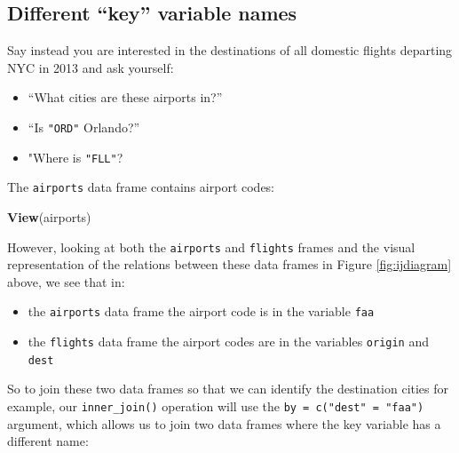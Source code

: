 \documentclass[12pt, krantz2,]{krantz}
\makeatletter
\newenvironment{Shaded}{\begin{snugshade}}{\end{snugshade}}
\newcommand{\DataTypeTok}[1]{\textcolor[rgb]{0.27,0.27,0.27}{#1}}
\newcommand{\KeywordTok}[1]{\textcolor[rgb]{0.27,0.27,0.27}{\textbf{#1}}}
\newcommand{\NormalTok}[1]{#1}
\newcommand{\OperatorTok}[1]{\textcolor[rgb]{0.43,0.43,0.43}{\textbf{#1}}}
\newcommand{\StringTok}[1]{\textcolor[rgb]{0.5,0.5,0.5}{#1}}
\providecommand{\tightlist}{%
  \setlength{\itemsep}{0pt}\setlength{\parskip}{0pt}}
\newenvironment{kframe}{%
\medskip{}
\setlength{\fboxsep}{.8em}
 \def\at@end@of@kframe{}%
 \ifinner\ifhmode%
  \def\at@end@of@kframe{\end{minipage}}%
  \begin{minipage}{\columnwidth}%
 \fi\fi%
 \def\FrameCommand##1{\hskip\@totalleftmargin \hskip-\fboxsep
 \colorbox{shadecolor}{##1}\hskip-\fboxsep
     \hskip-\linewidth \hskip-\@totalleftmargin \hskip\columnwidth}%
 \MakeFramed {\advance\hsize-\width
   \@totalleftmargin\z@ \linewidth\hsize
   \@setminipage}}%
 {\par\unskip\endMakeFramed%
 \at@end@of@kframe}
\renewenvironment{Shaded}{\begin{kframe}}{\end{kframe}}
\makeatother
\begin{document}
\hypertarget{diff-key}{%
\subsection{Different ``key'' variable names}\label{diff-key}}

Say instead you are interested in the destinations of all domestic flights departing NYC in 2013 and ask yourself:

\begin{itemize}
\tightlist
\item
  ``What cities are these airports in?''
\item
  ``Is \texttt{"ORD"} Orlando?''
\item
  "Where is \texttt{"FLL"}?
\end{itemize}

The \texttt{airports} data frame contains airport codes:

\begin{Shaded}
\begin{Highlighting}[]
\KeywordTok{View}\NormalTok{(airports)}
\end{Highlighting}
\end{Shaded}

However, looking at both the \texttt{airports} and \texttt{flights} frames and the visual representation of the relations between these data frames in Figure \ref{fig:ijdiagram} above, we see that in:

\begin{itemize}
\tightlist
\item
  the \texttt{airports} data frame the airport code is in the variable \texttt{faa}
\item
  the \texttt{flights} data frame the airport codes are in the variables \texttt{origin} and \texttt{dest}
\end{itemize}

So to join these two data frames so that we can identify the destination cities for example, our \texttt{inner\_join()} operation will use the \texttt{by\ =\ c("dest"\ =\ "faa")} argument, which allows us to join two data frames where the key variable has a different name:

\begin{Shaded}
\end{Shaded}
\end{document}
